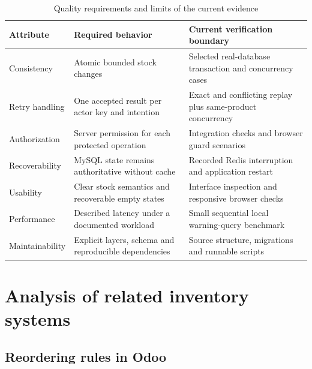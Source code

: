 \begin{table}[htbp]\centering\small{}\setlength{\tabcolsep}{3pt}\renewcommand{\arraystretch}{1.25}
\caption{Quality requirements and limits of the current evidence}\label{tab:quality}
\begin{tabular}{>{\raggedright\arraybackslash}p{}>{\raggedright\arraybackslash}p{}>{\raggedright\arraybackslash}p{}}
\toprule
\textbf{Attribute} & \textbf{Required behavior} & \textbf{Current verification boundary} \\
\midrule
\leavevmode{}Consistency & \leavevmode{}Atomic bounded stock changes & \leavevmode{}Selected real-database transaction and concurrency cases \\
\leavevmode{}Retry handling & \leavevmode{}One accepted result per actor key and intention & \leavevmode{}Exact and conflicting replay plus same-product concurrency \\
\leavevmode{}Authorization & \leavevmode{}Server permission for each protected operation & \leavevmode{}Integration checks and browser guard scenarios \\
\leavevmode{}Recoverability & \leavevmode{}MySQL state remains authoritative without cache & \leavevmode{}Recorded Redis interruption and application restart \\
\leavevmode{}Usability & \leavevmode{}Clear stock semantics and recoverable empty states & \leavevmode{}Interface inspection and responsive browser checks \\
\leavevmode{}Performance & \leavevmode{}Described latency under a documented workload & \leavevmode{}Small sequential local warning-query benchmark \\
\leavevmode{}Maintainability & \leavevmode{}Explicit layers, schema and reproducible dependencies & \leavevmode{}Source structure, migrations and runnable scripts \\
\bottomrule\end{tabular}\end{table}

\FloatBarrier

\section{Analysis of related inventory systems}

\subsection{Reordering rules in Odoo}

